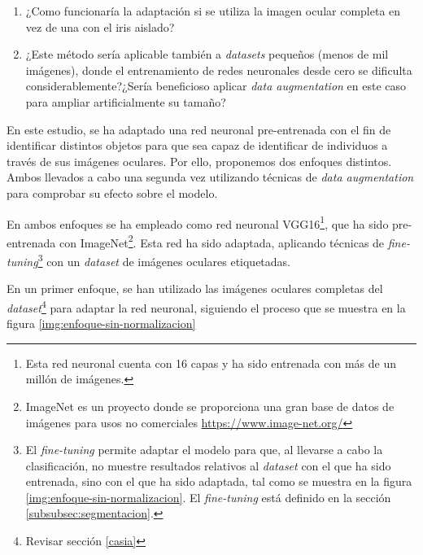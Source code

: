 \begin{enumerate}
    \item ¿Como funcionaría la adaptación si se utiliza la imagen ocular completa en vez de una con el iris aislado?
    \item ¿Este método sería aplicable también a \textit{datasets} pequeños (menos de mil imágenes), donde el entrenamiento de redes neuronales desde cero se dificulta considerablemente?¿Sería beneficioso aplicar \textit{data augmentation} en este caso para ampliar artificialmente su tamaño?
\end{enumerate}


En este estudio, se ha adaptado una red neuronal pre-entrenada con el fin de identificar distintos objetos para que sea capaz de identificar de individuos a través de sus imágenes oculares. Por ello, proponemos dos enfoques distintos. Ambos llevados a cabo una segunda vez utilizando técnicas de \textit{data augmentation} para comprobar su efecto sobre el modelo.

En ambos enfoques se ha empleado como red neuronal VGG16\footnote{Esta red neuronal cuenta con 16 capas y ha sido entrenada con más de un millón de imágenes.}, que ha sido pre-entrenada con ImageNet\footnote{ImageNet es un proyecto donde se proporciona 
una gran base de datos de imágenes para usos no comerciales \url{https://www.image-net.org/}}. Esta red ha sido adaptada, aplicando técnicas de \textit{fine-tuning}\footnote{El \textit{fine-tuning} 
permite adaptar el modelo para que, al llevarse a cabo la clasificación, no muestre resultados relativos al \textit{dataset} con el que ha sido entrenada, sino con el que ha sido adaptada, tal como se muestra en la figura \ref{img:enfoque-sin-normalizacion}. El \textit{fine-tuning} está definido en la sección \ref{subsubsec:segmentacion}.}
 con un \textit{dataset} de imágenes oculares etiquetadas.

En un primer enfoque, se han utilizado las imágenes oculares completas del \textit{dataset}\footnote{Revisar sección \ref{casia}} para adaptar la red neuronal, siguiendo el proceso que se muestra en la figura \ref{img:enfoque-sin-normalizacion}




